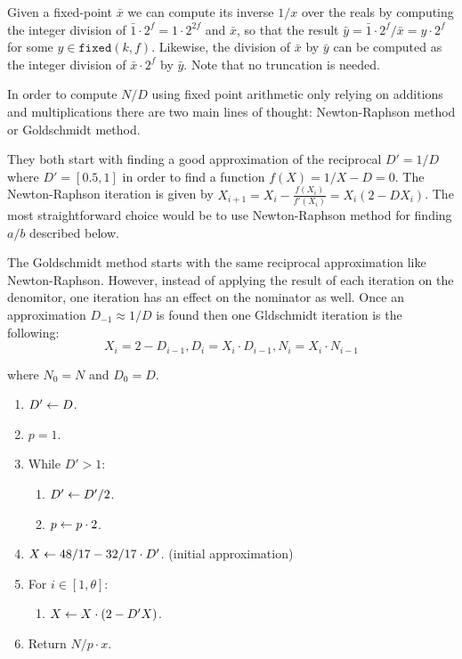 Given a fixed-point $\bar{x}$ we can compute its inverse $1/x$ over the reals by
computing the integer division of $\bar{1} \cdot 2^f = 1 \cdot 2^{2f}$ and $\bar{x}$,
so that the result $\bar{y} = \bar{1} \cdot 2^f / \bar{x} = y \cdot 2^f$ for some
$y \in \mathtt{fixed}(k, f)$. Likewise, the division of $\bar{x}$ by $\bar{y}$ can
be computed as the integer division of $\bar{x} \cdot 2^f$ by $\bar{y}$. Note that
no truncation is needed.

In order to compute $N/D$ using fixed point arithmetic only relying on additions
and multiplications there are two main lines of thought: Newton-Raphson method
or Goldschmidt method.

They both start with finding a good approximation of the reciprocal $D' = 1/D$
where $D' = [0.5, 1]$ in order to find a function $f(X) = 1/X - D = 0$. The
Newton-Raphson iteration is given by $X_{i+1} = X_i - \frac{f(X_i)}{f'(X_i)} =
X_i(2 - DX_i)$. The most straightforward choice would be to use Newton-Raphson
method for finding $a/b$ described below.

The Goldschmidt method starts with the same reciprocal approximation like
Newton-Raphson. However, instead of applying the result of each iteration on the
denomitor, one iteration has an effect on the nominator as well.  Once an
approximation $D_{-1} \approx 1/D$ is found then one Gldschmidt iteration is the
following:
$$
X_i = 2 - D_{i-1}, 
D_i = X_i \cdot D_{i-1},
N_i = X_i \cdot N_{i-1}
$$

where $N_0 = N$ and $D_0 = D$.

\begin{enumerate}
  \item $D' \gets D$.
  \item $p = 1$.
  \item While $D' > 1$:
  \begin{enumerate}
    \item $D' \gets D' / 2$.
    \item $p \gets p \cdot 2$.
  \end{enumerate}
  \item $X \gets 48/17 - 32/17 \cdot D'$. (initial approximation)
  \item For $i \in [1, \theta]$:
  \begin{enumerate}
      \item $X \gets X \cdot (2 - D'X)$.
  \end{enumerate}
  \item Return $N / p \cdot x$.
\end{enumerate}



